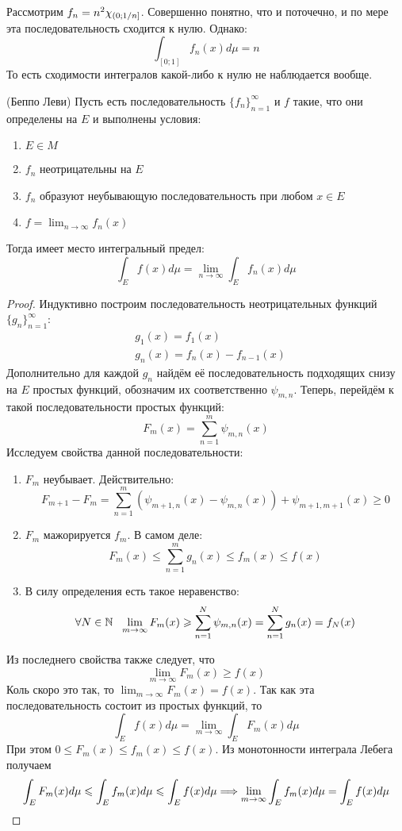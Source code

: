 \begin{example}
	Рассмотрим $f_n = n^2 \chi_{\left(0; 1 / n\right]}$. Совершенно понятно, что и поточечно, и по мере эта последовательность сходится к нулю. Однако:
	\[
		\int_{[0; 1]} f_n(x)d\mu = n
	\]
	То есть сходимости интегралов какой-либо к нулю не наблюдается вообще.
\end{example}

\begin{theorem} (Беппо Леви)
	Пусть есть последовательность $\{f_n\}_{n = 1}^\infty$ и $f$ такие, что они определены на $E$ и выполнены условия:
	\begin{enumerate}
		\item $E \in M$
		
		\item $f_n$ неотрицательны на $E$
		
		\item $f_n$ образуют неубывающую последовательность при любом $x \in E$
		
		\item $f = \lim_{n \to \infty} f_n(x)$
	\end{enumerate}
	Тогда имеет место интегральный предел:
	\[
		\int_E f(x)d\mu = \lim_{n \to \infty} \int_E f_n(x)d\mu
	\]
\end{theorem}

\begin{proof}
	Индуктивно построим последовательность неотрицательных функций $\{g_n\}_{n = 1}^\infty$:
	\begin{align*}
		&{g_1(x) = f_1(x)}
		\\
		&{g_n(x) = f_n(x) - f_{n - 1}(x)}
	\end{align*}
	Дополнительно для каждой $g_n$ найдём её последовательность подходящих снизу на $E$ простых функций, обозначим их соответственно $\psi_{m, n}$. Теперь, перейдём к такой последовательности простых функций:
	\[
		F_m(x) = \sum_{n = 1}^m \psi_{m, n}(x)
	\]
	Исследуем свойства данной последовательности:
	\begin{enumerate}
		\item $F_m$ неубывает. Действительно:
		\[
			F_{m + 1} - F_m = \sum_{n = 1}^m (\psi_{m + 1, n}(x) - \psi_{m, n}(x)) + \psi_{m + 1, m + 1}(x) \ge 0
		\]
		
		\item $F_m$ мажорируется $f_m$. В самом деле:
		\[
			F_m(x) \le \sum_{n = 1}^m g_n(x) \le f_m(x) \le f(x)
		\]
		
		\item В силу определения есть такое неравенство:
		\[
			\forall N \in \mathbb{N}\ \ \lim_{m \to \infty} F_m(x) \geqslant \sum_{n = 1}^N \psi_{m, n}(x) = \sum_{n = 1}^N g_n(x) = f_N(x)
		\]
	\end{enumerate}
	Из последнего свойства также следует, что
	\[
		\lim_{m \to \infty} F_m(x) \ge f(x)
	\]
	Коль скоро это так, то $\lim_{m \to \infty} F_m(x) = f(x)$. Так как эта последовательность состоит из простых функций, то
	\[
		\int_E f(x)d\mu = \lim_{m \to \infty} \int_E F_m(x)d\mu
	\]
	При этом $0 \le F_m(x) \le f_m(x) \le f(x)$. Из монотонности интеграла Лебега получаем
	\[
		\int_E F_m(x)d\mu \leqslant \int_E f_m(x)d\mu \leqslant \int_E f(x)d\mu \Longrightarrow \lim_{m \to \infty} \int_E f_m(x)d\mu = \int_E f(x)d\mu
	\]
\end{proof}

